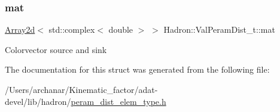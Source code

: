 \subsubsection{\texorpdfstring{mat}{mat}}
{\footnotesize\ttfamily \mbox{\hyperlink{classXMLArray_1_1Array2d}{Array2d}}$<$ std\+::complex$<$ double $>$ $>$ Hadron\+::\+Val\+Peram\+Dist\+\_\+t\+::mat}

Colorvector source and sink 

The documentation for this struct was generated from the following file\+:\begin{DoxyCompactItemize}
\item 
/\+Users/archanar/\+Kinematic\+\_\+factor/adat-\/devel/lib/hadron/\mbox{\hyperlink{adat-devel_2lib_2hadron_2peram__dist__elem__type_8h}{peram\+\_\+dist\+\_\+elem\+\_\+type.\+h}}\end{DoxyCompactItemize}
